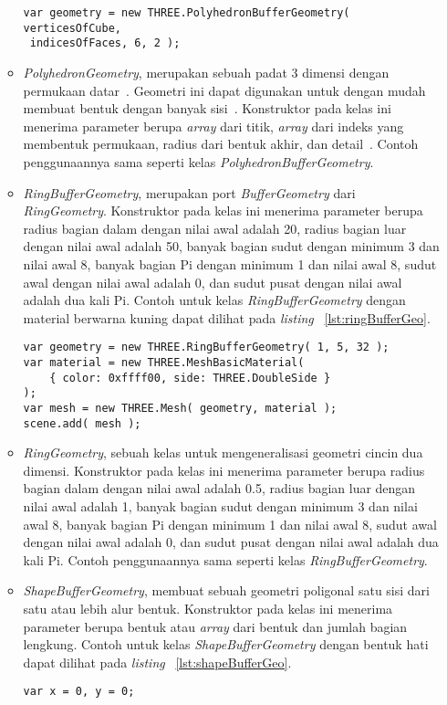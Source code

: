 \begin{itemize}
\begin{itemize}
\begin{lstlisting}[caption={Contoh penggunaan kelas {\it PolyhedronBufferGeometry}.}, label={lst:polyhedronBufferGeo},captionpos=b]
var geometry = new THREE.PolyhedronBufferGeometry( verticesOfCube,
 indicesOfFaces, 6, 2 );
\end{lstlisting}
		\item {\it PolyhedronGeometry}, merupakan sebuah padat 3 dimensi dengan permukaan datar~\cite{threejs}. Geometri ini dapat digunakan untuk dengan mudah membuat bentuk dengan banyak sisi~\cite{learningThreejs}. Konstruktor pada kelas ini menerima parameter berupa {\it array} dari titik, {\it array} dari indeks yang membentuk permukaan, radius dari bentuk akhir, dan detail~\cite{threejs}. Contoh penggunaannya sama seperti kelas {\it PolyhedronBufferGeometry}.
		\item {\it RingBufferGeometry}, merupakan port {\it BufferGeometry} dari {\it RingGeometry}. Konstruktor pada kelas ini menerima parameter berupa radius bagian dalam dengan nilai awal adalah 20, radius bagian luar dengan nilai awal adalah 50, banyak bagian sudut dengan minimum 3 dan nilai awal 8, banyak bagian Pi dengan minimum 1 dan nilai awal 8, sudut awal dengan nilai awal adalah 0, dan sudut pusat dengan nilai awal adalah dua kali Pi. Contoh untuk kelas {\it RingBufferGeometry} dengan material berwarna kuning dapat dilihat pada {\it listing} ~\ref{lst:ringBufferGeo}.
\begin{lstlisting}[caption={Contoh penggunaan kelas {\it RingBufferGeometry}.}, label={lst:ringBufferGeo},captionpos=b]
var geometry = new THREE.RingBufferGeometry( 1, 5, 32 );
var material = new THREE.MeshBasicMaterial( 
	{ color: 0xffff00, side: THREE.DoubleSide } 
);
var mesh = new THREE.Mesh( geometry, material );
scene.add( mesh );
\end{lstlisting}
		\item {\it RingGeometry}, sebuah kelas untuk mengeneralisasi geometri cincin dua dimensi. Konstruktor pada kelas ini menerima parameter berupa radius bagian dalam dengan nilai awal adalah 0.5, radius bagian luar dengan nilai awal adalah 1, banyak bagian sudut dengan minimum 3 dan nilai awal 8, banyak bagian Pi dengan minimum 1 dan nilai awal 8, sudut awal dengan nilai awal adalah 0, dan sudut pusat dengan nilai awal adalah dua kali Pi.  Contoh penggunaannya sama seperti kelas {\it RingBufferGeometry}.
		\item {\it ShapeBufferGeometry}, membuat sebuah geometri poligonal satu sisi dari satu atau lebih alur bentuk. Konstruktor pada kelas ini menerima parameter berupa bentuk atau {\it array} dari bentuk dan jumlah bagian lengkung. Contoh untuk kelas {\it ShapeBufferGeometry} dengan bentuk hati dapat dilihat pada {\it listing} ~\ref{lst:shapeBufferGeo}.
\begin{lstlisting}[caption={Contoh penggunaan kelas {\it ShapeBufferGeometry}.}, label={lst:shapeBufferGeo},captionpos=b]
var x = 0, y = 0;


\end{lstlisting}
\end{itemize}
\end{itemize}
